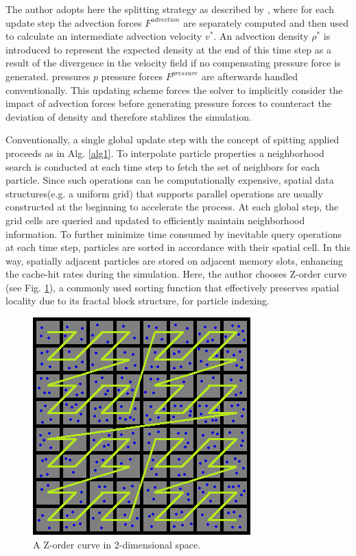 \documentclass[
	11pt, 
	DIV10,
	ngerman,
	a4paper, 
	oneside, 
	headings=normal, 
	captions=tableheading,
	final, 
	numbers=noenddot
]{scrartcl}
\begin{document}
The author adopts here the splitting strategy as described by \cite{ihmsen2014sph}, where for each update step the advection forces $ F^{advection} $ are separately computed and then used to calculate an intermediate advection velocity $ v^{*} $. An advection density $ \rho^{*} $ is introduced to represent the expected density at the end of this time step as a result of the divergence in the velocity field if no compensating pressure force is generated. pressures $ p $ pressure forces $ F^{pressure} $ are afterwards handled conventionally. This updating scheme forces the solver to implicitly consider the impact of advection forces before generating pressure forces to counteract the deviation of density and therefore stablizes the simulation.
\par
Conventionally, a single global update step with the concept of spitting applied proceeds as in Alg. \ref{alg1}. To interpolate particle properties a neighborhood search is conducted at each time step to fetch the set of neighbors for each particle. Since such operations can be computationally expensive, spatial data
structures(e.g. a uniform grid) that supports parallel operations are usually constructed at the beginning to accelerate the process. At each global step, the grid cells are queried and updated to efficiently maintain neighborhood information. To further minimize time consumed by inevitable query operations at each time step, particles are sorted in accordance with their spatial cell. In this way, spatially adjacent particles are stored on adjacent memory slots, enhancing the cache-hit rates during the simulation. Here, the author chooses Z-order curve (see Fig. \ref{fig6}), a commonly used sorting function that effectively preserves spatial locality due to its fractal block structure, for particle indexing.

\begin{figure}[tb]
	\centering
	\includegraphics[scale=0.5]{images/z}
	\caption{\label{fig6} A Z-order curve in 2-dimensional space.}
\end{figure}
\end{document}
